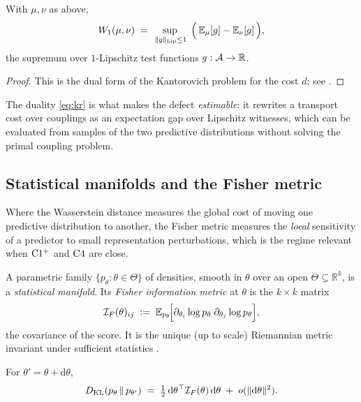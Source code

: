 \begin{proposition}
\label{prop:kr-duality}
With $\mu,\nu$ as above,
\begin{equation}
  \label{eq:kr}
  W_{1}(\mu,\nu)
  \;=\;
  \sup_{\,\|g\|_{\mathrm{Lip}}\le 1}\;
  \Big(\,\mathbb{E}_{\mu}[g] - \mathbb{E}_{\nu}[g]\,\Big),
\end{equation}
the supremum over $1$-Lipschitz test functions $g:\mathcal{A}\to\mathbb{R}$.
\end{proposition}

\begin{proof}
This is the dual form of the Kantorovich problem for the cost $d$; see
\citet[Thm.~5.10 and Particular Case~5.16]{villani2009}.
\end{proof}

The duality \eqref{eq:kr} is what makes the defect \emph{estimable}: it
rewrites a transport cost over couplings as an expectation gap over Lipschitz
witnesses, which can be evaluated from samples of the two predictive
distributions without solving the primal coupling problem.

\subsection{Statistical manifolds and the Fisher metric}
\label{subsec:fisher}

Where the Wasserstein distance measures the global cost of moving one
predictive distribution to another, the Fisher metric measures the
\emph{local} sensitivity of a predictor to small representation
perturbations, which is the regime relevant when $\mathrm{C1^{+}}$ and
$\mathrm{C}4$ are close.

\begin{definition}
\label{def:fisher}
A parametric family $\{p_\theta:\theta\in\Theta\}$ of densities, smooth in
$\theta$ over an open $\Theta\subseteq\mathbb{R}^k$, is a \emph{statistical
manifold}. Its \emph{Fisher information metric} at $\theta$ is the
$k\times k$ matrix
\[
  \mathcal{I}_{F}(\theta)_{ij}
  \;\vcentcolon=\;
  \mathbb{E}_{p_\theta}\!\Big[
    \partial_{\theta_i}\log p_\theta \;
    \partial_{\theta_j}\log p_\theta
  \Big],
\]
the covariance of the score. It is the unique (up to scale) Riemannian metric
invariant under sufficient statistics \citep[Ch.~2--3]{amarinagaoka2000}.
\end{definition}

\begin{proposition}
\label{prop:kl-fisher}
For $\theta'=\theta+\mathrm{d}\theta$,
\[
  D_{\mathrm{KL}}\!\left(p_\theta \,\Vert\, p_{\theta'}\right)
  \;=\;
  \tfrac12\,\mathrm{d}\theta^\top \mathcal{I}_{F}(\theta)\,\mathrm{d}\theta
  \;+\; o(\|\mathrm{d}\theta\|^2).
\]
\end{proposition}

